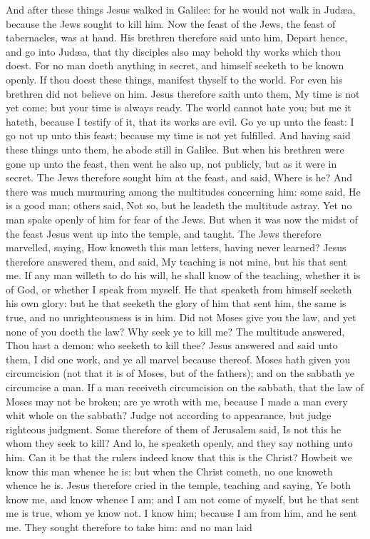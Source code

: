 And after these things Jesus walked in Galilee: for he would not walk in Judæa, because the Jews sought to kill him. Now the feast of the Jews, the feast of tabernacles, was at hand. His brethren therefore said unto him, Depart hence, and go into Judæa, that thy disciples also may behold thy works which thou doest. For no man doeth anything in secret, and himself seeketh to be known openly. If thou doest these things, manifest thyself to the world. For even his brethren did not believe on him. Jesus therefore saith unto them, My time is not yet come; but your time is always ready. The world cannot hate you; but me it hateth, because I testify of it, that its works are evil. Go ye up unto the feast: I go not up unto this feast; because my time is not yet fulfilled. And having said these things unto them, he abode still in Galilee.  But when his brethren were gone up unto the feast, then went he also up, not publicly, but as it were in secret. The Jews therefore sought him at the feast, and said, Where is he? And there was much murmuring among the multitudes concerning him: some said, He is a good man; others said, Not so, but he leadeth the multitude astray. Yet no man spake openly of him for fear of the Jews.  But when it was now the midst of the feast Jesus went up into the temple, and taught. The Jews therefore marvelled, saying, How knoweth this man letters, having never learned? Jesus therefore answered them, and said, My teaching is not mine, but his that sent me. If any man willeth to do his will, he shall know of the teaching, whether it is of God, or whether I speak from myself. He that speaketh from himself seeketh his own glory: but he that seeketh the glory of him that sent him, the same is true, and no unrighteousness is in him. Did not Moses give you the law, and yet none of you doeth the law? Why seek ye to kill me? The multitude answered, Thou hast a demon: who seeketh to kill thee? Jesus answered and said unto them, I did one work, and ye all marvel because thereof. Moses hath given you circumcision (not that it is of Moses, but of the fathers); and on the sabbath ye circumcise a man. If a man receiveth circumcision on the sabbath, that the law of Moses may not be broken; are ye wroth with me, because I made a man every whit whole on the sabbath? Judge not according to appearance, but judge righteous judgment.  Some therefore of them of Jerusalem said, Is not this he whom they seek to kill? And lo, he speaketh openly, and they say nothing unto him. Can it be that the rulers indeed know that this is the Christ? Howbeit we know this man whence he is: but when the Christ cometh, no one knoweth whence he is. Jesus therefore cried in the temple, teaching and saying, Ye both know me, and know whence I am; and I am not come of myself, but he that sent me is true, whom ye know not. I know him; because I am from him, and he sent me. They sought therefore to take him: and no man laid 